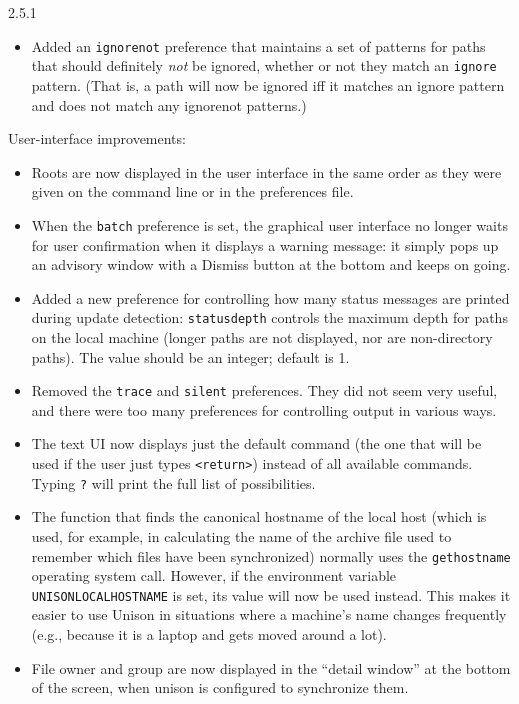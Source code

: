 \begin{changesfromversion}{2.5.1}
\begin{itemize}
\item Added an \verb|ignorenot| preference that maintains a set of patterns
  for paths that should definitely {\em not} be ignored, whether or not
  they match an \verb|ignore| pattern.  (That is, a path will now be ignored
  iff it matches an ignore pattern and does not match any ignorenot patterns.)
\end{itemize}

\item User-interface improvements:
\begin{itemize}
\item Roots are now displayed in the user interface in the same order
as they were given on the command line or in the preferences file.
\item When the \verb|batch| preference is set, the graphical user interface no
  longer waits for user confirmation when it displays a warning message: it
  simply pops up an advisory window with a Dismiss button at the bottom and
  keeps on going.
\item Added a new preference for controlling how many status messages are
  printed during update detection: \verb|statusdepth| controls the maximum
  depth for paths on the local machine (longer paths are not displayed, nor
  are non-directory paths).  The value should be an integer; default is 1.
\item Removed the \verb|trace| and \verb|silent| preferences.  They did
not seem very useful, and there were too many preferences for controlling
output in various ways.
\item The text UI now displays just the default command (the one that
will be used if the user just types \verb|<return>|) instead of all
available commands.  Typing \verb|?| will print the full list of
possibilities.
\item The function that finds the canonical hostname of the local host
(which is used, for example, in calculating the name of the archive file
used to remember which files have been synchronized) normally uses the
\verb|gethostname| operating system call.  However, if the environment
variable \verb|UNISONLOCALHOSTNAME| is set, its value will now be used
instead.  This makes it easier to use Unison in situations where a
machine's name changes frequently (e.g., because it is a laptop and gets
moved around a lot).
\item File owner and group are now displayed in the ``detail window'' at
the bottom of the screen, when unison is configured to synchronize them.
\end{itemize}


\end{changesfromversion}
